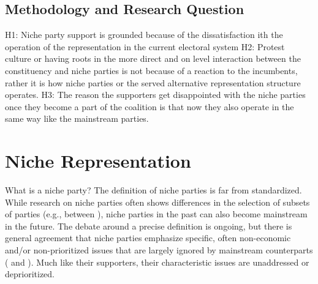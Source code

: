 \section{Methodology and Research Question}\label{sec:Methodology and Research Question} %

H1: Niche party support is grounded because of the dissatisfaction ith the operation
of the representation in the current electoral system 
H2: Protest culture or  having roots in the more direct and on level
interaction between the constituency and niche parties is not because of a
reaction to the incumbents, rather it is how niche parties or the served
alternative representation structure operates.
H3: The reason the supporters get disappointed with the niche parties once they
become a part of the coalition is that now they also operate in the same way
like the mainstream parties. 

%
%
%
\chapter{Niche Representation}\label{chap:Niche Representation} %


What is a niche party? The definition of niche parties is far from standardized. While research on niche parties often shows differences in the selection of subsets of parties (e.g., between \cite{adams2006, nonnemacher2023}), niche parties in the past can also become mainstream in the future. The debate around a precise definition is ongoing, but there is general agreement that niche parties emphasize specific, often non-economic and/or non-prioritized issues that are largely ignored by mainstream counterparts (\cite[see 30]{nonnemacher2023} and \cite[1]{stiers2024}). Much like their supporters, their characteristic issues are unaddressed or deprioritized.

